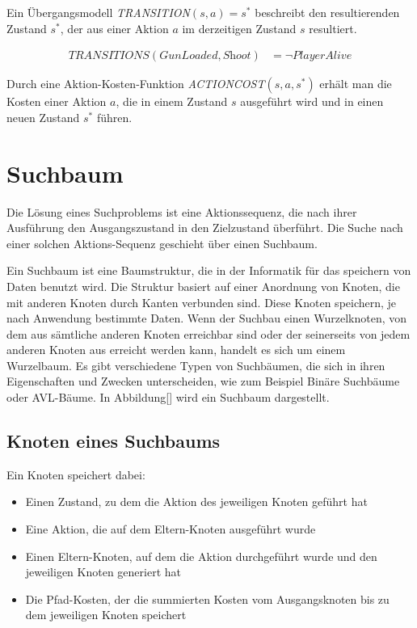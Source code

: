 Ein Übergangsmodell \textit{TRANSITION}$(s,a) = s^*$ beschreibt den resultierenden Zustand $s^*$, der aus einer Aktion $a$ im derzeitigen Zustand $s$ resultiert.

\begin{align}
	\textit{TRANSITIONS}(\textit{GunLoaded}, \textit{Shoot}) &= \lnot \textit{PlayerAlive}
\end{align}

Durch eine Aktion-Kosten-Funktion \textit{ACTIONCOST}$(s,a,s^*)$ erhält man die Kosten einer Aktion $a$, die in einem Zustand $s$ ausgeführt wird und in einen neuen Zustand $s^*$ führen.

\section{Suchbaum}
\label{chap:suchbaum}

Die Lösung eines Suchproblems ist eine Aktionssequenz, die nach ihrer Ausführung den Ausgangszustand in den Zielzustand überführt. Die Suche nach einer solchen Aktions-Sequenz geschieht über einen Suchbaum.

Ein Suchbaum ist eine Baumstruktur, die in der Informatik für das speichern von Daten benutzt wird. Die Struktur basiert auf einer Anordnung von Knoten, die mit anderen Knoten durch Kanten verbunden sind. Diese Knoten speichern, je nach Anwendung bestimmte Daten. Wenn der Suchbau einen Wurzelknoten, von dem aus sämtliche anderen Knoten erreichbar sind oder der seinerseits von jedem anderen Knoten aus erreicht werden kann, handelt es sich um einem Wurzelbaum. Es gibt verschiedene Typen von Suchbäumen, die sich in ihren Eigenschaften und Zwecken unterscheiden, wie zum Beispiel Binäre Suchbäume oder AVL-Bäume. In Abbildung\ref{} wird ein Suchbaum dargestellt.

\subsection{Knoten eines Suchbaums}
\label{chap: knoten eines suchbaums}

Ein Knoten speichert dabei:
\begin{itemize}
	\item Einen Zustand, zu dem die Aktion des jeweiligen Knoten geführt hat
	\item Eine Aktion, die auf dem Eltern-Knoten ausgeführt wurde
	\item Einen Eltern-Knoten, auf dem die Aktion durchgeführt wurde und den jeweiligen Knoten generiert hat
	\item Die Pfad-Kosten, der die summierten Kosten vom Ausgangsknoten bis zu dem jeweiligen Knoten speichert
\end{itemize}

